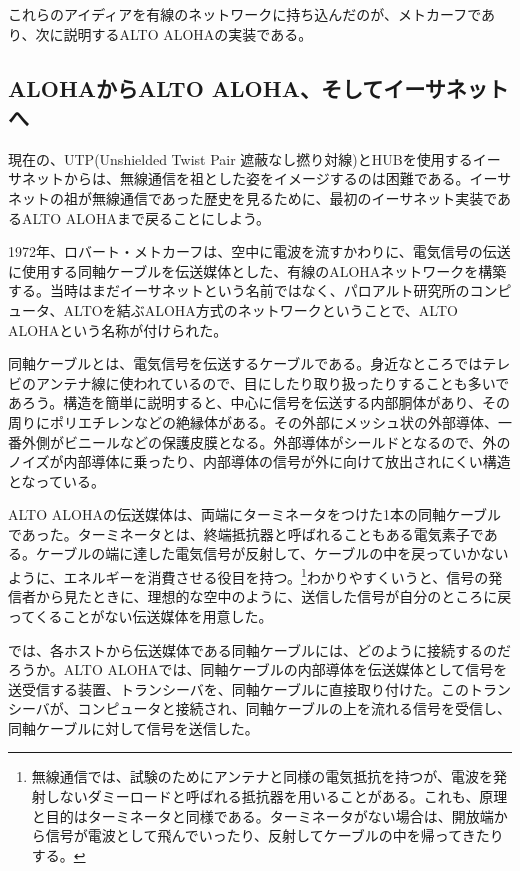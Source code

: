 これらのアイディアを有線のネットワークに持ち込んだのが、メトカーフであり、次に説明するALTO ALOHAの実装である。

\subsection{ALOHAからALTO ALOHA、そしてイーサネットへ}

現在の、UTP(Unshielded Twist Pair 遮蔽なし撚り対線)とHUBを使用するイーサネットからは、無線通信を祖とした姿をイメージするのは困難である。イーサネットの祖が無線通信であった歴史を見るために、最初のイーサネット実装であるALTO ALOHAまで戻ることにしよう。

1972年、ロバート・メトカーフは、空中に電波を流すかわりに、電気信号の伝送に使用する同軸ケーブルを伝送媒体とした、有線のALOHAネットワークを構築する。当時はまだイーサネットという名前ではなく、パロアルト研究所のコンピュータ、ALTOを結ぶALOHA方式のネットワークということで、ALTO ALOHAという名称が付けられた。

同軸ケーブルとは、電気信号を伝送するケーブルである。身近なところではテレビのアンテナ線に使われているので、目にしたり取り扱ったりすることも多いであろう。構造を簡単に説明すると、中心に信号を伝送する内部胴体があり、その周りにポリエチレンなどの絶縁体がある。その外部にメッシュ状の外部導体、一番外側がビニールなどの保護皮膜となる。外部導体がシールドとなるので、外のノイズが内部導体に乗ったり、内部導体の信号が外に向けて放出されにくい構造となっている。

ALTO ALOHAの伝送媒体は、両端にターミネータをつけた1本の同軸ケーブルであった。ターミネータとは、終端抵抗器と呼ばれることもある電気素子である。ケーブルの端に達した電気信号が反射して、ケーブルの中を戻っていかないように、エネルギーを消費させる役目を持つ。\footnote{無線通信では、試験のためにアンテナと同様の電気抵抗を持つが、電波を発射しないダミーロードと呼ばれる抵抗器を用いることがある。これも、原理と目的はターミネータと同様である。ターミネータがない場合は、開放端から信号が電波として飛んでいったり、反射してケーブルの中を帰ってきたりする。}わかりやすくいうと、信号の発信者から見たときに、理想的な空中のように、送信した信号が自分のところに戻ってくることがない伝送媒体を用意した。

では、各ホストから伝送媒体である同軸ケーブルには、どのように接続するのだろうか。ALTO ALOHAでは、同軸ケーブルの内部導体を伝送媒体として信号を送受信する装置、トランシーバを、同軸ケーブルに直接取り付けた。このトランシーバが、コンピュータと接続され、同軸ケーブルの上を流れる信号を受信し、同軸ケーブルに対して信号を送信した。

